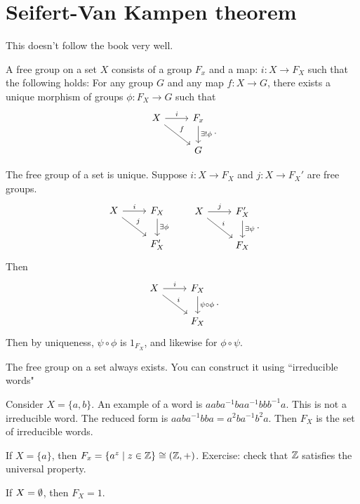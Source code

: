 
\setcounter{chapter}{10}
\chapter{Seifert-Van Kampen theorem}
\begin{note}
    This doesn't follow the book very well.
\end{note}


\begin{definition}
    A free group on a set $X$ consists of a group $F_x$ and a map: $i: X \to F_X$ such that the following holds:
For any group $G$ and any map $f: X \to G$, there exists a unique morphism of groups $\phi: F_X \to G$ such that 
\[
\begin{tikzcd}
    X \arrow[r, "i"] \arrow[dr, "f"] & F_x \arrow[d, "\exists !\phi"]\\
                                     & G
\end{tikzcd}
.\] 
    
\end{definition}
\begin{note}
    The free group of a set is unique.
    Suppose $i: X \to  F_X$ and $j : X \to  F_X'$ are free groups.
    \[
    \begin{tikzcd}
        X \arrow[r, "i"] \arrow[dr, "j"]& F_X \arrow[d, "\exists \phi"]\\
                                        & F_X'
    \end{tikzcd}
    \qquad
    \begin{tikzcd}
        X \arrow[r, "j"] \arrow[dr, "i"]& F_X' \arrow[d, "\exists \psi"]\\
                                        & F_X
    \end{tikzcd}
    .\] 
    Then 
    \[
    \begin{tikzcd}
        X \arrow[r, "i"] \arrow[dr, "i"]& F_X \arrow[d, "\psi  \circ  \phi"]\\
        &F_X
    \end{tikzcd}
    .\] 
    Then by uniqueness, $\psi  \circ  \phi$ is $1_{F_X}$, and likewise for $\phi  \circ  \psi$.
\end{note}
\begin{note}
    The free group on a set always exists. You can construct it using ``irreducible words"
\end{note}
\begin{eg}
    Consider $X = \{a, b\}$.
    An example of a word is $a a b a^{-1} b a a^{-1} b b b^{-1} a$.
    This is not a irreducible word. The reduced form is $a a b a^{-1} b b a = a^2 b a^{-1} b^2 a$.
    Then $F_X$ is the set of irreducible words.
\end{eg}
\begin{eg}
    If $X = \{a\}$, then $F_x = \{a^{z}  \mid z \in \mathbb{Z}\} \cong (\mathbb{Z}, +)$.
    Exercise: check that $\mathbb{Z}$ satisfies the universal property.
\end{eg}
\begin{eg}
    If $X = \emptyset$, then  $F_X = 1$.
\end{eg}


